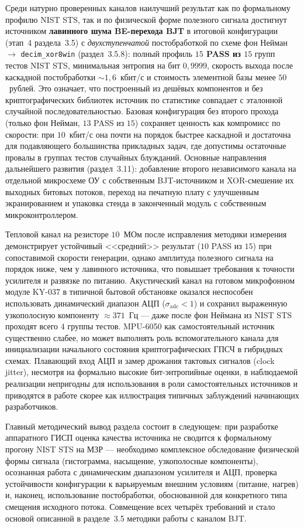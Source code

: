 Среди натурно проверенных каналов наилучший результат как по формальному профилю
NIST STS, так и по физической форме полезного сигнала достигнут источником
\textbf{лавинного шума BE-перехода BJT} в итоговой конфигурации (этап~4
раздела~3.5) с \emph{двухступенчатой} постобработкой по схеме фон Нейман $\to$
\texttt{decim\_xor8win} (раздел~3.5.8): полный профиль \textbf{$15$ PASS из $15$}
групп тестов NIST STS, минимальная энтропия на бит $0{,}9999$, скорость выхода
после каскадной постобработки $\sim 1{,}6$~кбит/с и стоимость элементной базы
менее $50$~рублей. Это означает, что построенный из дешёвых компонентов и без
криптографических библиотек источник по статистике совпадает с эталонной случайной
последовательностью. Базовая конфигурация без второго прохода (только фон Нейман,
$13$ PASS из $15$) сохраняет ценность как компромисс по скорости: при $10$~кбит/с
она почти на порядок быстрее каскадной и достаточна для подавляющего большинства
прикладных задач, где допустимы остаточные провалы в группах тестов случайных
блужданий. Основные направления дальнейшего развития (раздел~3.11): добавление
второго независимого канала на отдельной микросхеме ОУ с собственным
BJT-источником и XOR-смешение их выходных битовых потоков, переход на печатную
плату с улучшенным экранированием и упаковка стенда в законченный модуль с
собственным микроконтроллером.

Тепловой канал на резисторе $10$~МОм после исправления методики измерения
демонстрирует устойчивый <<средний>> результат ($10$ PASS из $15$) при сопоставимой
скорости генерации, однако амплитуда полезного сигнала на порядок ниже, чем у
лавинного источника, что повышает требования к точности усилителя и развязке
по питанию. Акустический канал на готовом микрофонном модуле KY-037 в типичной
бытовой обстановке оказался неспособен использовать динамический диапазон АЦП
($\sigma_\mathrm{adc}<1$) и сохранил выраженную узкополосную компоненту
${\approx}371$~Гц --- даже после фон Неймана из NIST STS проходят всего
$4$ группы тестов. MPU-6050 как самостоятельный источник существенно слабее,
но может выполнять роль вспомогательного канала для инициализации начального
состояния криптографических ГПСЧ в гибридных схемах. Плавающий вход АЦП и
замер дрожания тактовых сигналов (clock jitter), несмотря на формально высокие
бит-энтропийные оценки, в наблюдаемой реализации непригодны для использования
в роли самостоятельных источников и приводятся в работе скорее как иллюстрация
типичных заблуждений начинающих разработчиков.

Главный методический вывод раздела состоит в следующем: при разработке
аппаратного ГИСП оценка качества источника не сводится к формальному прогону
NIST STS на МЗР --- необходимо комплексное обследование физической формы сигнала
(гистограмма, насыщение, узкополосные компоненты), осознанная работа с
динамическим диапазоном усилителя и АЦП, проверка устойчивости конфигурации к
варьируемым внешним условиям (питание, нагрев) и, наконец, использование
постобработки, обоснованной для конкретного типа смещения исходного потока.
Совмещение всех четырёх требований и стало основой описанной в разделе~3.5
методики работы с каналом BJT.

